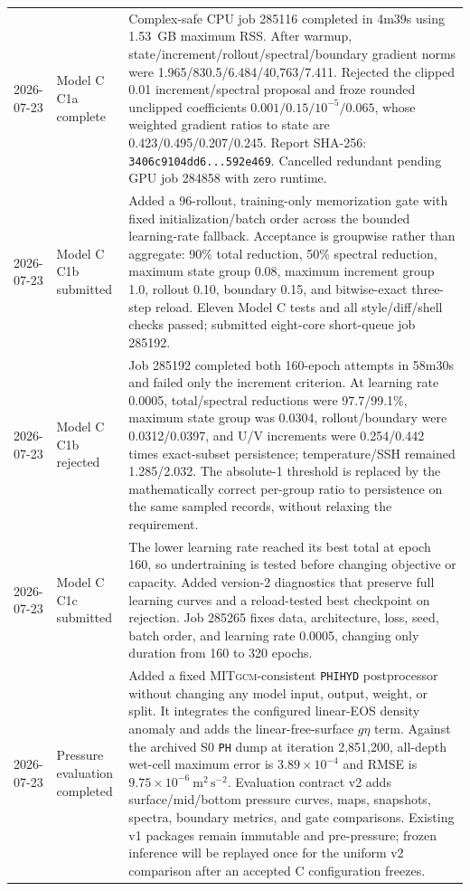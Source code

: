 \documentclass[11pt]{article}
\newcommand{\MITgcm}{\textsc{MITgcm}}
\begin{document}
\begin{longtable}{@{}p{}p{}p{}@{}}
2026-07-23 & Model C C1a complete & Complex-safe CPU job 285116 completed in 4m39s using 1.53~GB maximum RSS.  After warmup, state/increment/rollout/spectral/boundary gradient norms were 1.965/830.5/6.484/40,763/7.411.  Rejected the clipped 0.01 increment/spectral proposal and froze rounded unclipped coefficients \(0.001/0.15/10^{-5}/0.065\), whose weighted gradient ratios to state are 0.423/0.495/0.207/0.245.  Report SHA-256: \texttt{3406c9104dd6...592e469}.  Cancelled redundant pending GPU job 284858 with zero runtime. \\
2026-07-23 & Model C C1b submitted & Added a 96-rollout, training-only memorization gate with fixed initialization/batch order across the bounded learning-rate fallback.  Acceptance is groupwise rather than aggregate: 90\% total reduction, 50\% spectral reduction, maximum state group 0.08, maximum increment group 1.0, rollout 0.10, boundary 0.15, and bitwise-exact three-step reload.  Eleven Model C tests and all style/diff/shell checks passed; submitted eight-core short-queue job 285192. \\
2026-07-23 & Model C C1b rejected & Job 285192 completed both 160-epoch attempts in 58m30s and failed only the increment criterion.  At learning rate 0.0005, total/spectral reductions were 97.7/99.1\%, maximum state group was 0.0304, rollout/boundary were 0.0312/0.0397, and U/V increments were 0.254/0.442 times exact-subset persistence; temperature/SSH remained 1.285/2.032.  The absolute-1 threshold is replaced by the mathematically correct per-group ratio to persistence on the same sampled records, without relaxing the requirement. \\
2026-07-23 & Model C C1c submitted & The lower learning rate reached its best total at epoch 160, so undertraining is tested before changing objective or capacity.  Added version-2 diagnostics that preserve full learning curves and a reload-tested best checkpoint on rejection.  Job 285265 fixes data, architecture, loss, seed, batch order, and learning rate 0.0005, changing only duration from 160 to 320 epochs. \\
2026-07-23 & Pressure evaluation completed & Added a fixed \MITgcm{}-consistent \texttt{PHIHYD} postprocessor without changing any model input, output, weight, or split.  It integrates the configured linear-EOS density anomaly and adds the linear-free-surface \(g\eta\) term.  Against the archived S0 \texttt{PH} dump at iteration 2,851,200, all-depth wet-cell maximum error is \(3.89\times10^{-4}\) and RMSE is \(9.75\times10^{-6}\ \mathrm{m^2\,s^{-2}}\).  Evaluation contract v2 adds surface/mid/bottom pressure curves, maps, snapshots, spectra, boundary metrics, and gate comparisons.  Existing v1 packages remain immutable and pre-pressure; frozen inference will be replayed once for the uniform v2 comparison after an accepted C configuration freezes. \\

\end{longtable}
\end{document}
